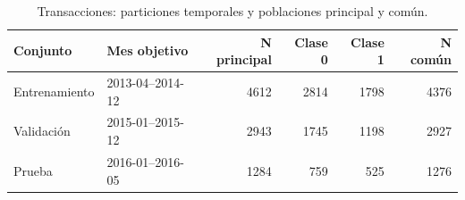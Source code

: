 \begin{table}[htbp]
\centering\small
\caption{Transacciones: particiones temporales y poblaciones principal y común.}\label{tab:tf-particiones}
\begin{tabular}{llrrrr}\toprule
Conjunto & Mes objetivo & N principal & Clase 0 & Clase 1 & N común \\ \midrule
Entrenamiento & 2013-04--2014-12 & 4612 & 2814 & 1798 & 4376 \\
Validación & 2015-01--2015-12 & 2943 & 1745 & 1198 & 2927 \\
Prueba & 2016-01--2016-05 & 1284 & 759 & 525 & 1276 \\
\bottomrule\end{tabular}
\end{table}
